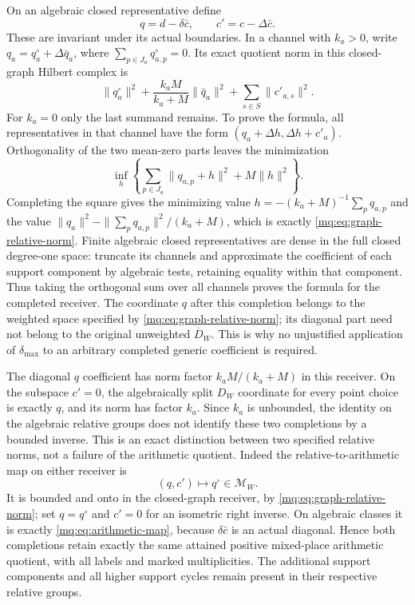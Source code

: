 On an algebraic closed representative define
\[
 q=d-\delta\bar c,\qquad c'=c-\Delta\bar c.
 \tag{MQ24}\label{mq:eq:relative-coordinates}
\]
These are invariant under its actual boundaries. In a channel
with $k_a>0$, write $q_a=q_a^{\circ}+\Delta\bar q_a$, where
$\sum_{p\in J_a}q_{a,p}^{\circ}=0$. Its exact quotient norm
in this closed-graph Hilbert complex is
\[
 \|q_a^{\circ}\|^2+
       \frac{k_aM}{k_a+M}\|\bar q_a\|^2+
       \sum_{s\in S}\|c'_{a,s}\|^2.
 \tag{MQ25}\label{mq:eq:graph-relative-norm}
\]
For $k_a=0$ only the last summand remains. To prove the formula,
all representatives in that channel have the form
$(q_a+\Delta h,\Delta h+c'_a)$. Orthogonality of the two
mean-zero parts leaves the minimization
\[
 \inf_h\left\{\sum_{p\in J_a}\|q_{a,p}+h\|^2
                              +M\|h\|^2\right\}.
\]
Completing the square gives the minimizing value
$h=-(k_a+M)^{-1}\sum_pq_{a,p}$ and the value
$\|q_a\|^2-\|\sum_pq_{a,p}\|^2/(k_a+M)$, which is exactly
\eqref{mq:eq:graph-relative-norm}. Finite algebraic closed
representatives are dense in the full closed degree-one space:
truncate its channels and approximate the coefficient of each
support component by algebraic tests, retaining equality within
that component. Thus taking the orthogonal sum over all channels
proves the formula for the completed receiver. The coordinate $q$
after this completion belongs to the weighted space specified by
\eqref{mq:eq:graph-relative-norm}; its diagonal part need not belong
to the original unweighted $\overline D_W$. This is why no
unjustified application of $\delta_{\max}$ to an arbitrary
completed generic coefficient is required.

The diagonal $q$ coefficient has norm factor $k_aM/(k_a+M)$
in this receiver. On the subspace $c'=0$, the algebraically
split $D_W$ coordinate for every point choice is exactly $q$,
and its norm has factor $k_a$. Since $k_a$ is unbounded, the identity on the
algebraic relative groups does not identify these two completions
by a bounded inverse. This is an exact distinction between two
specified relative norms, not a failure of the arithmetic quotient.
Indeed the relative-to-arithmetic map on either receiver is
\[
 (q,c')\longmapsto q^{\circ}\in\mathscr M_W.
 \tag{MQ26}\label{mq:eq:completed-arithmetic-image}
\]
It is bounded and onto in the closed-graph receiver, by
\eqref{mq:eq:graph-relative-norm}; set $q=q^{\circ}$ and $c'=0$
for an isometric right inverse. On algebraic classes it is exactly
\eqref{mq:eq:arithmetic-map}, because $\delta\bar c$ is an actual
diagonal. Hence both completions retain exactly the same attained
positive mixed-place arithmetic quotient, with all labels and
marked multiplicities. The additional support components and
all higher support cycles remain present in their respective
relative groups.

